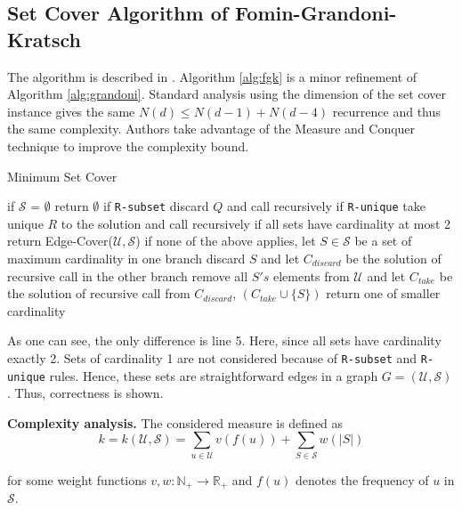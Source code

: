 \subsection{Set Cover Algorithm of Fomin-Grandoni-Kratsch}
The algorithm is described in \cite{10.1145/1552285.1552286}. Algorithm \ref{alg:fgk} is a minor refinement of Algorithm \ref{alg:grandoni}. Standard analysis using the dimension of the set cover instance gives the same $N(d) \leq N(d -1) + N(d - 4)$ recurrence and thus the same complexity. Authors take advantage of the Measure and Conquer technique to improve the complexity bound.
\begin{algorithm}
\caption{Minimum Set Cover}
\label{alg:fgk}
\begin{algorithmic}[1]
\State if $\mathcal{S}$ = $\emptyset$ return $\emptyset$ 
\State if \texttt{R-subset} discard $Q$ and call recursively
\State if \texttt{R-unique} take unique $R$ to the solution and call recursively
\State if all sets have cardinality at most 2 return Edge-Cover($\mathcal{U}, \mathcal{S}$)
\State if none of the above applies, let $S \in \mathcal{S}$ be a set of maximum cardinality
\State in one branch discard $S$ and let $C_{discard}$ be the solution of recursive call
\State in the other branch remove all $S's$ elements from $\mathcal{U}$ and let $C_{take}$ be the solution of recursive call
\State from $C_{discard}$, $(C_{take} \cup \{S\})$ return one of smaller cardinality
\EndProcedure
\end{algorithmic}
\end{algorithm}
\par As one can see, the only difference is line 5. Here, since all sets have cardinality exactly 2. Sets of cardinality 1 are not considered because of \texttt{R-subset} and \texttt{R-unique} rules. Hence, these sets are straightforward edges in a graph $G = (\mathcal{U}, \mathcal{S})$. Thus, correctness is shown.
\par \textbf{Complexity analysis.} 
The considered measure is defined as
\begin{equation}\label{measure_definition}
    k =  k(\mathcal{U}, \mathcal{S}) = \sum_{u \in \mathcal{U}} v(f(u)) + \sum_{S \in \mathcal{S}} w(|S|)
\end{equation}

for some weight functions $v, w : \mathbb{N_+} \rightarrow \mathbb{R_+}$ and $f(u)$ denotes the frequency of $u$ in $\mathcal{S}$.

